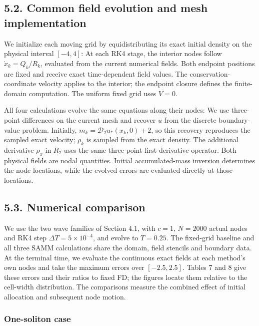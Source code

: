 \subsection*{5.2. Common field evolution and mesh implementation}

We initialize each moving grid by equidistributing its exact initial density on the physical interval \([-4,4]\):
At each RK4 stage, the interior nodes follow \(\dot x_k=Q_k/R_k\), evaluated from the current numerical fields. Both endpoint positions are fixed and receive exact time-dependent field values. The conservation-coordinate velocity applies to the interior; the endpoint closure defines the finite-domain computation. The uniform fixed grid uses \(V=0\).

All four calculations evolve the same equations along their nodes:
We use three-point differences on the current mesh and recover \(u\) from the discrete boundary-value problem. Initially, \(m_k=\mathcal D_2u_*(x_k,0)+2\), so this recovery reproduces the sampled exact velocity; \(\rho_k\) is sampled from the exact density. The additional derivative \(\rho_x\) in \(R_2\) uses the same three-point first-derivative operator. Both physical fields are nodal quantities. Initial accumulated-mass inversion determines the node locations, while the evolved errors are evaluated directly at those locations.

\subsection*{5.3. Numerical comparison}

We use the two wave families of Section 4.1, with \(c=1\), \(N=2000\) actual nodes and RK4 step \(\Delta T=5\times10^{-4}\), and evolve to \(T=0.25\). The fixed-grid baseline and all three SAMM calculations share the domain, field stencils and boundary data. At the terminal time, we evaluate the continuous exact fields at each method's own nodes and take the maximum errors over \([-2.5,2.5]\). Tables 7 and 8 give these errors and their ratios to fixed FD; the figures locate them relative to the cell-width distribution. The comparisons measure the combined effect of initial allocation and subsequent node motion.

\subsubsection*{One-soliton case}

